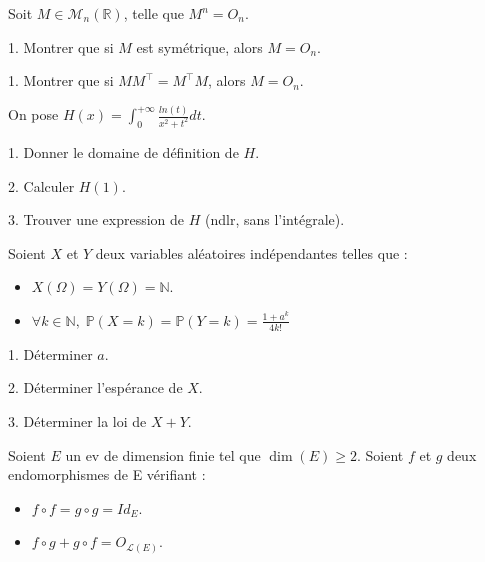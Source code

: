 \noindent Soit $M \in \mathcal{M}_n(\mathbb{R})$, telle que $M^n = O_n$.

\vspace{5pt}
1. Montrer que si $M$ est symétrique, alors $M = O_n$.

\vspace{5pt}
1. Montrer que si $MM^\top = M^\top M$, alors $M = O_n$.



\subetoiles



\noindent On pose $\displaystyle H(x) = \int_{0}^{+\infty} \frac {ln(t)} {x^2 + t^2} dt$.

\vspace{5pt}
1. Donner le domaine de définition de $H$.

\vspace{5pt}
2. Calculer $H(1)$.

\vspace{5pt}
3. Trouver une expression de $H$ (ndlr, sans l'intégrale).




\subetoiles



\noindent Soient $X$ et $Y$ deux variables aléatoires indépendantes telles que :
\begin{itemize}
  \item $X(\Omega) = Y(\Omega) = \mathbb{N}$.
  \item $\displaystyle \forall k \in \mathbb{N}, \; \mathbb{P}(X = k) = \mathbb{P}(Y = k) = \frac {1+a^k} {4k!}$
\end{itemize}


\vspace{5pt}
1. Déterminer $a$.

\vspace{5pt}
2. Déterminer l'espérance de $X$.

\vspace{5pt}
3. Déterminer la loi de $X + Y$.




\subetoiles
\columnbreak



\noindent Soient $E$ un ev de dimension finie tel que $\dim(E) \geqslant 2$.
\noindent Soient $f$ et $g$ deux \\ endomorphismes de E vérifiant :
\begin{itemize}
  \item $f \circ f = g \circ g = Id_E$.
  \item $f \circ g + g \circ f = O_{\mathcal{L}(E)}$.
\end{itemize}

